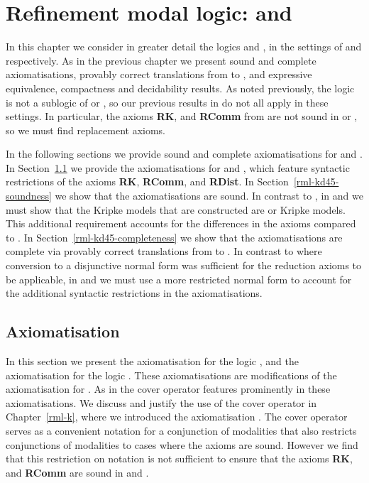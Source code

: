 \chapter{Refinement modal logic: \classKFF{} and \classKD{}}\label{rml-kd45}

In this chapter we consider in greater detail the logics \logicRmlKFF{} and \logicRmlKD{}, in the settings of \classKFF{} and \classKD{} respectively.
As in the previous chapter we present sound and complete axiomatisations, provably correct translations from \langRml{} to \langMl{}, and expressive equivalence, compactness and decidability results.
As noted previously, the logic \logicRmlK{} is not a sublogic of \logicRmlKFF{} or \logicRmlKD{}, so our previous results in \logicRmlK{} do not all apply in these settings.
In particular, the axioms {\bf RK}, and {\bf RComm} from \axiomRmlK{} are not sound in \logicRmlKFF{} or \logicRmlKD{}, so we must find replacement axioms.

In the following sections we provide sound and complete axiomatisations for \logicRmlKFF{} and \logicRmlKD{}.
In Section~\ref{rml-kd45-axiomatisation} we provide the axiomatisations for \logicRmlKFF{} and \logicRmlKD{}, which feature syntactic restrictions of the axioms {\bf RK}, {\bf RComm}, and {\bf RDist}.
In Section~\ref{rml-kd45-soundness} we show that the axiomatisations are sound.
In contrast to \logicRmlK{}, in \logicRmlKFF{} and \logicRmlKD{} we must show that the Kripke models that are constructed are \classKFF{} or \classKD{} Kripke models.
This additional requirement accounts for the differences in the axioms compared to \logicRmlK{}.
In Section~\ref{rml-kd45-completeness} we show that the axiomatisations are complete via provably correct translations from \langRml{} to \langMl{}.
In contrast to \logicRmlK{} where conversion to a disjunctive normal form was sufficient for the reduction axioms to be applicable, in \logicRmlKFF{} and \logicRmlKD{} we must use a more restricted normal form to account for the additional syntactic restrictions in the axiomatisations.

\section{Axiomatisation}\label{rml-kd45-axiomatisation}

In this section we present the axiomatisation \axiomRmlKFF{} for the logic \logicRmlKFF{}, and the axiomatisation \axiomRmlKD{} for the logic \logicRmlKD{}.
These axiomatisations are modifications of the axiomatisation \axiomRmlK{} for \logicRmlK{}.
As in \axiomRmlK{} the cover operator features prominently in these axiomatisations.
We discuss and justify the use of the cover operator in Chapter~\ref{rml-k}, where we introduced the axiomatisation \axiomRmlK{}.
The cover operator serves as a convenient notation for a conjunction of modalities that also restricts conjunctions of modalities to cases where the axioms are sound.
However we find that this restriction on notation is not sufficient to ensure that the axioms {\bf RK}, and {\bf RComm} are sound in \logicRmlKFF{} and \logicRmlKD{}.

